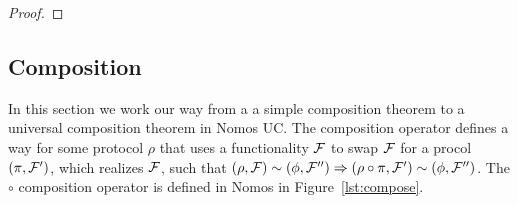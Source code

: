\begin{proof}
%
%
%
%
%
\end{proof}

\subsection{Composition}
In this section we work our way from a a simple composition theorem to a universal composition theorem in Nomos UC.
The composition operator defines a way for some protocol $\rho$ that uses a functionality $\mathcal{F}$ to swap $\mathcal{F}$ for a procol $(\pi, \mathcal{F}')$, which realizes $\mathcal{F}$, such that $(\rho, \mathcal{F}) \sim (\phi, \mathcal{F}'') \Rightarrow (\rho \circ \pi, \mathcal{F}') \sim (\phi, \mathcal{F}'')$.
The $\circ$ composition operator is defined in Nomos in Figure~\ref{lst:compose}.


